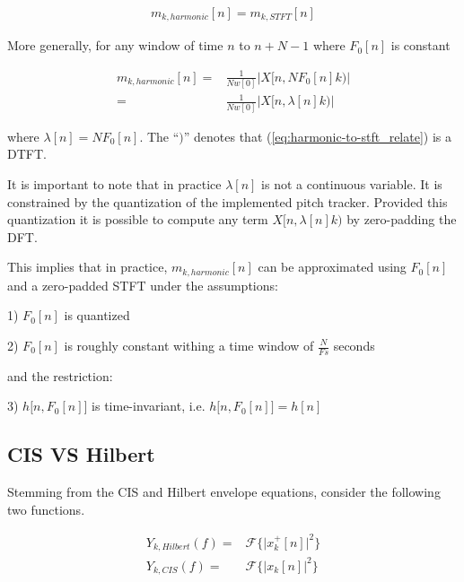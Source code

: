 \documentclass [11pt, proquest,oneside] {ganter_thesis}[2015/03/03]
\begin{document}
\begin{align}
m_{k,harmonic}[n] = m_{k,STFT}[n]
\end{align}

More generally, for any window of time $n$ to $n + N - 1$ where $F_0[n]$ is constant

\begin{align}
%
%
%
m_{k,harmonic}[n] =& \frac{1}{Nw[0]} \Big| X[n, N F_0[n] k) \Big| \nonumber \\
%
\label{eq:harmonic-to-stft_relate}
=& \frac{1}{Nw[0]} \Big| X[n, \lambda[n]k) \Big|
\end{align}

where $\lambda[n] = N F_0[n] $.  The ``$)$'' denotes that (\ref{eq:harmonic-to-stft_relate}) is a DTFT.

It is important to note that in practice $\lambda[n]$ is not a continuous variable.  It is constrained by the quantization of the implemented pitch tracker.  Provided this quantization it is possible to compute any term $X[n, \lambda[n]k)$ by zero-padding the DFT.

This implies that in practice, $m_{k,harmonic}[n]$ can be approximated using $F_0[n]$ and a zero-padded STFT under the assumptions:

1) $F_0[n]$ is quantized

2) $F_0[n]$ is roughly constant withing a time window of $\frac{N}{Fs}$ seconds

and the restriction:

3) $h\Big[n, F_0[n] \Big]$ is time-invariant, i.e. $h\Big[n, F_0[n] \Big] = h[n]$

\subsection{CIS VS Hilbert}

Stemming from the CIS and Hilbert envelope equations, consider the following two functions.

\begin{align}
\label{eq:hilbert_squared}
Y_{k,Hilbert}(f) =& \mathcal{F}\Big\{ \Big| x^+_k[n] \Big|^2  \Big\} \\
\label{eq:cis_squared_prefilter}
Y_{k,CIS}(f) =& \mathcal{F}\Big\{ \Big| x_k[n] \Big|^2  \Big\}
\end{align}
\end{document}
